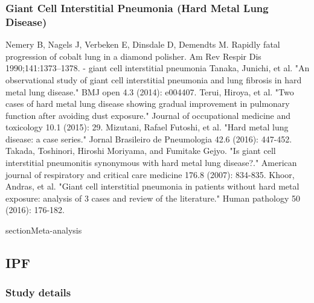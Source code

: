 \documentclass[a4
er,12pt]{article}
\begin{document}
\subsubsection{Giant Cell Interstitial Pneumonia (Hard Metal Lung Disease)}
Nemery B, Nagels J, Verbeken E, Dinsdale D, Demendts M. Rapidly
fatal progression of cobalt lung in a diamond polisher. Am Rev Respir
Dis 1990;141:1373–1378. - giant cell interstitial pneumonia
Tanaka, Junichi, et al. "An observational study of giant cell interstitial pneumonia and lung fibrosis in hard metal lung disease." BMJ open 4.3 (2014): e004407.
Terui, Hiroya, et al. "Two cases of hard metal lung disease showing gradual improvement in pulmonary function after avoiding dust exposure." Journal of occupational medicine and toxicology 10.1 (2015): 29.
Mizutani, Rafael Futoshi, et al. "Hard metal lung disease: a case series." Jornal Brasileiro de Pneumologia 42.6 (2016): 447-452.
Takada, Toshinori, Hiroshi Moriyama, and Fumitake Gejyo. "Is giant cell interstitial pneumonitis synonymous with hard metal lung disease?." American journal of respiratory and critical care medicine 176.8 (2007): 834-835.
Khoor, Andras, et al. "Giant cell interstitial pneumonia in patients without hard metal exposure: analysis of 3 cases and review of the literature." Human pathology 50 (2016): 176-182.




%

section{Meta-analysis}

\subsection{IPF}

\subsubsection{Study details}
\end{document}
